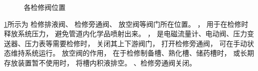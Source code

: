 \documentclass[UTF8,a4paper,12pt,titlepage]{ctexart}
\begin{document}
\begin{figure}[h]
         \caption{各检修阀位置}\label{fig:p3}
      \end{figure}

\newpage

      \ref{fig:p3}所示为
      检修排液阀、
      检修旁通阀、
      放空阀等阀门所在位置。
      ，
      用于在检修时释放系统压力，
      避免管道内化学品喷射出来。
      ，
      是电磁流量计、电动阀、压力变送器、压力表等需要检修时，
      关闭其上下游阀门，
      打开检修旁通阀，
      可在手动状态维持系统运行。
      放空阀的作用，
      在于检修制备槽、熟化槽、储药槽时，
      或长期存放装置暂不使用时，
      将槽内积液排空。
      、检修旁通阀关闭。
\end{document}
